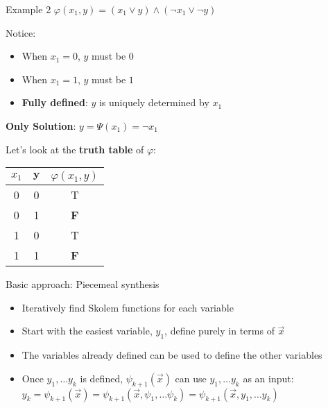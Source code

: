\documentclass[aspectratio=169]{beamer}
\begin{document}
\begin{frame}{Example 2}
$\varphi(x_1, y) = (x_1 \lor y) \land (\neg x_1 \lor \neg y)$
\bigskip

Notice:
\begin{itemize}
    \item When $x_1 = 0$, $y$ must be $0$
    \item When $x_1 = 1$, $y$ must be $1$
    \item \textbf{Fully defined}: $y$ is uniquely determined by $x_1$
\end{itemize}
\bigskip

\textbf{Only Solution}: $y = \Psi(x_1) = \neg x_1$
\bigskip

Let's look at the \textbf{truth table} of \(\varphi\):
\begin{tabular}{|c|c|c|}
    \hline
    $x_1$ & $\mathbf{y}$ & $\varphi(x_1, y)$ \\
    \hline
    0 & 0 & T\\
    0 & 1 & \textbf{F}\\
    1 & 0 & T\\
    1 & 1 & \textbf{F}\\
    \hline
\end{tabular}
\end{frame}

\begin{frame}{Basic approach: Piecemeal synthesis}
\begin{itemize}
    \item Iteratively find Skolem functions for each variable
    \item Start with the easiest variable, $y_1$, define purely in terms of $\vec{x}$
    \item The variables already defined can be used to define the other variables
    \item Once $y_1, \ldots y_k$ is defined, $\psi_{k+1}(\vec{x})$ can use $y_1,\ldots y_k$ as an input:
        $y_k=\psi_{k+1}(\vec{x}) =
        \psi_{k+1}(\vec{x}, \psi_1, \ldots \psi_k) =
        \psi_{k+1}(\vec{x}, y_1, \ldots y_k)$
\end{itemize}
\bigskip

\end{frame}
\end{document}
